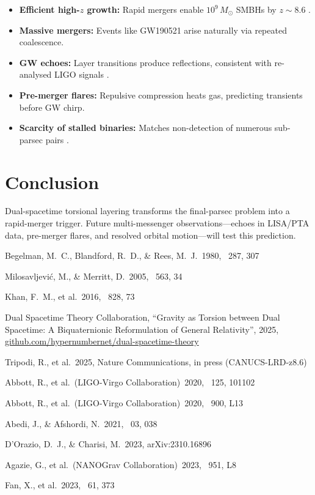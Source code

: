 \documentclass[dvipdfmx,11pt,a4paper]{article}
\begin{document}
\begin{itemize}
\item \textbf{Efficient high-$z$ growth:} Rapid mergers enable $10^{9}\,M_\odot$ SMBHs by $z\sim 8.6$ \citep{Tripodi2025}.
\item \textbf{Massive mergers:} Events like GW190521 \citep{LVC2020a,LVC2020b} arise naturally via repeated coalescence.
\item \textbf{GW echoes:} Layer transitions produce reflections, consistent with re-analysed LIGO signals \citep{Abedi2021}.
\item \textbf{Pre-merger flares:} Repulsive compression heats gas, predicting transients before GW chirp.
\item \textbf{Scarcity of stalled binaries:} Matches non-detection of numerous sub-parsec pairs \citep{Dorazio2023}.
\end{itemize}

\section{Conclusion}

Dual-spacetime torsional layering transforms the final-parsec problem into a rapid-merger trigger. Future multi-messenger observations—echoes in LISA/PTA data, pre-merger flares, and resolved orbital motion—will test this prediction.


\begin{thebibliography}{}

Begelman, M.~C., Blandford, R.~D., \& Rees, M.~J.\ 1980, \, 287, 307

Milosavljević, M., \& Merritt, D.\ 2005, \, 563, 34

Khan, F.~M., et al.\ 2016, \, 828, 73

Dual Spacetime Theory Collaboration, ``Gravity as Torsion between Dual Spacetime: A Biquaternionic Reformulation of General Relativity'', 2025, \href{https://github.com/hypernumbernet/dual-spacetime-theory}{github.com/hypernumbernet/dual-spacetime-theory}

Tripodi, R., et al.\ 2025, Nature Communications, in press (CANUCS-LRD-z8.6)

Abbott, R., et al.\ (LIGO-Virgo Collaboration)\ 2020, \, 125, 101102

Abbott, R., et al.\ (LIGO-Virgo Collaboration)\ 2020, \, 900, L13

Abedi, J., \& Afshordi, N.\ 2021, \, 03, 038

D'Orazio, D.~J., \& Charisi, M.\ 2023, arXiv:2310.16896

Agazie, G., et al.\ (NANOGrav Collaboration)\ 2023, \, 951, L8

Fan, X., et al.\ 2023, \, 61, 373

\end{thebibliography}
\end{document}
